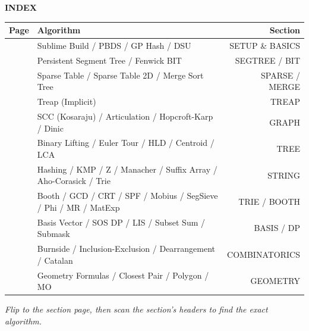 \vspace*{-0.5cm}
\begin{center}
{\Large\textbf{INDEX}}
\end{center}

\vspace{-0.3cm}
{\small
\renewcommand{\arraystretch}{1.4}
\begin{tabular}{lp{7.5cm}r}
\hline
\textbf{Page} & \textbf{Algorithm} & \textbf{Section} \\
\hline
\pageref{sec:01} & Sublime Build / PBDS / GP Hash / DSU & SETUP \& BASICS \\
\pageref{sec:02} & Persistent Segment Tree / Fenwick BIT & SEGTREE / BIT \\
\pageref{sec:03} & Sparse Table / Sparse Table 2D / Merge Sort Tree & SPARSE / MERGE \\
\pageref{sec:04} & Treap (Implicit) & TREAP \\
\pageref{sec:05} & SCC (Kosaraju) / Articulation / Hopcroft-Karp / Dinic & GRAPH \\
\pageref{sec:06} & Binary Lifting / Euler Tour / HLD / Centroid / LCA & TREE \\
\pageref{sec:07} & Hashing / KMP / Z / Manacher / Suffix Array / Aho-Corasick / Trie & STRING \\
\pageref{sec:08} & Booth / GCD / CRT / SPF / Mobius / SegSieve / Phi / MR / MatExp & TRIE / BOOTH \\
\pageref{sec:09} & Basis Vector / SOS DP / LIS / Subset Sum / Submask & BASIS / DP \\
\pageref{sec:10} & Burnside / Inclusion-Exclusion / Dearrangement / Catalan & COMBINATORICS \\
\pageref{sec:11} & Geometry Formulas / Closest Pair / Polygon / MO & GEOMETRY \\
\hline
\end{tabular}
}

\vfill
\small\textit{Flip to the section page, then scan the section's headers to find the exact algorithm.}
